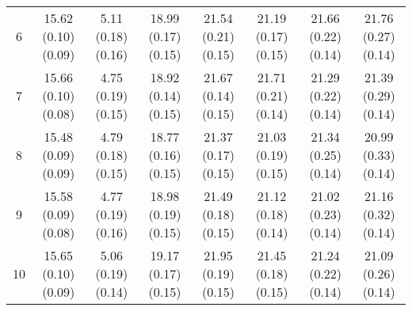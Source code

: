 \begin{table}[H]
{\begin{tabular}{*{8}{c}}
   6 &  15.62 (0.10)  (0.09) &   5.11 (0.18)  (0.16) &  18.99 (0.17)  (0.15) &  21.54 (0.21)  (0.15) &  21.19 (0.17)  (0.15) &  21.66 (0.22)  (0.14) &  21.76 (0.27)  (0.14) \\
   7 &  15.66 (0.10)  (0.08) &   4.75 (0.19)  (0.15) &  18.92 (0.14)  (0.15) &  21.67 (0.14)  (0.15) &  21.71 (0.21)  (0.14) &  21.29 (0.22)  (0.14) &  21.39 (0.29)  (0.14) \\
   8 &  15.48 (0.09)  (0.09) &   4.79 (0.18)  (0.15) &  18.77 (0.16)  (0.15) &  21.37 (0.17)  (0.15) &  21.03 (0.19)  (0.15) &  21.34 (0.25)  (0.14) &  20.99 (0.33)  (0.14) \\
   9 &  15.58 (0.09)  (0.08) &   4.77 (0.19)  (0.16) &  18.98 (0.19)  (0.15) &  21.49 (0.18)  (0.15) &  21.12 (0.18)  (0.14) &  21.02 (0.23)  (0.14) &  21.16 (0.32)  (0.14) \\
  10 &  15.65 (0.10)  (0.09) &   5.06 (0.19)  (0.14) &  19.17 (0.17)  (0.15) &  21.95 (0.19)  (0.15) &  21.45 (0.18)  (0.15) &  21.24 (0.22)  (0.14) &  21.09 (0.26)  (0.14) \\
\end{tabular}
}
\end{table}






